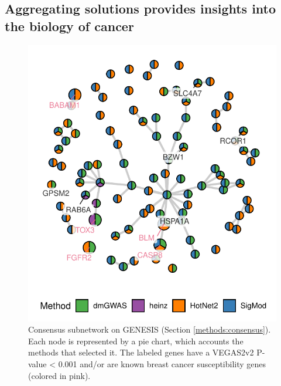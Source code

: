 \documentclass[twocolumn, 10pt]{article}
\begin{document}
\subsection{Aggregating solutions provides insights into the biology of cancer}
\label{results:consensus}
\begin{figure}[htbp]
\centering
\includegraphics[width=.9\linewidth]{./figures/figure_3.pdf}
\caption{\label{fig:consensus}
  Consensus subnetwork on GENESIS (Section \ref{methods:consensus}). Each node is represented by a pie chart, which accounts the methods that selected it. The labeled genes have a VEGAS2v2 P-value < 0.001 and/or are known breast cancer susceptibility genes (colored in pink).}
\end{figure}
\end{document}
